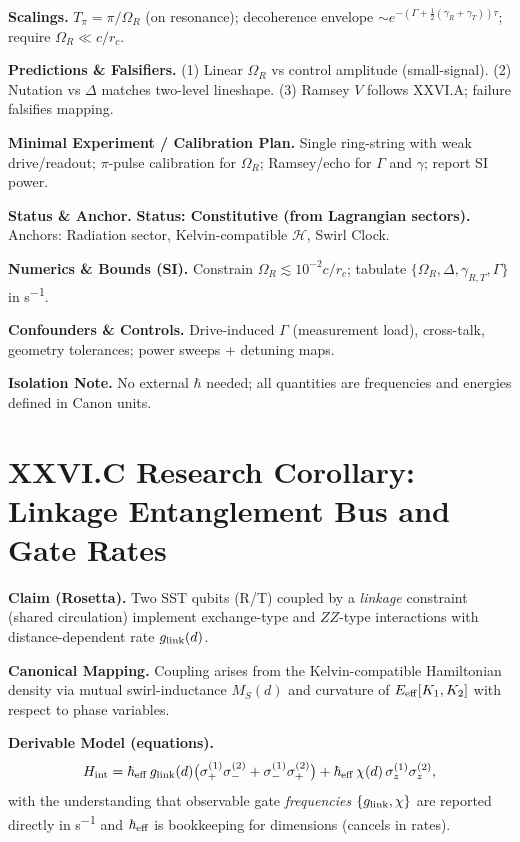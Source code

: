 \documentclass[10pt,reprint,aps,onecolumn,nofootinbib]{revtex4-2}
\begin{document}
    \textbf{Scalings.}
    $T_\pi=\pi/\Omega_R$ (on resonance); decoherence envelope $\sim e^{-(\Gamma+\tfrac{1}{2}(\gamma_R+\gamma_T))\tau}$; require $\Omega_R \ll c/r_c$.

    \textbf{Predictions \& Falsifiers.}
    (1) Linear $\Omega_R$ vs control amplitude (small-signal). (2) Nutation vs $\Delta$ matches two-level lineshape. (3) Ramsey $V$ follows XXVI.A; failure falsifies mapping.

    \textbf{Minimal Experiment / Calibration Plan.}
    Single ring-string with weak drive/readout; $\pi$-pulse calibration for $\Omega_R$; Ramsey/echo for $\Gamma$ and $\gamma$; report SI power.

    \textbf{Status \& Anchor.}
    \textbf{Status: Constitutive (from Lagrangian sectors).} Anchors: Radiation sector, Kelvin-compatible $\mathcal H$, Swirl Clock.

    \textbf{Numerics \& Bounds (SI).}
    Constrain $\Omega_R \lesssim 10^{-2} c/r_c$; tabulate $\{\Omega_R,\Delta,\gamma_{R,T},\Gamma\}$ in \si{s^{-1}}.

    \textbf{Confounders \& Controls.}
    Drive-induced $\Gamma$ (measurement load), cross-talk, geometry tolerances; power sweeps + detuning maps.

    \textbf{Isolation Note.}
    No external $\hbar$ needed; all quantities are frequencies and energies defined in Canon units.


    \section*{XXVI.C Research Corollary: Linkage Entanglement Bus and Gate Rates}

    \textbf{Claim (Rosetta).}
    Two SST qubits (R/T) coupled by a \emph{linkage} constraint (shared circulation) implement exchange-type and $ZZ$-type interactions with distance-dependent rate $g_{\rm link}(d)$.

    \textbf{Canonical Mapping.}
    Coupling arises from the Kelvin-compatible Hamiltonian density via mutual swirl-inductance $M_{\!S}(d)$ and curvature of $E_{\rm eff}[K_1,K_2]$ with respect to phase variables.

    \textbf{Derivable Model (equations).}
    \[
        H_{\rm int} = \hbar_{\rm eff}\, g_{\rm link}(d)\big(\sigma_+^{(1)}\sigma_-^{(2)}+\sigma_-^{(1)}\sigma_+^{(2)}\big)
        + \hbar_{\rm eff}\,\chi(d)\,\sigma_z^{(1)}\sigma_z^{(2)} ,
    \]
    with the understanding that observable gate \emph{frequencies} $\{g_{\rm link},\chi\}$ are reported directly in \si{s^{-1}} and $\hbar_{\rm eff}$ is bookkeeping for dimensions (cancels in rates).
\end{document}
